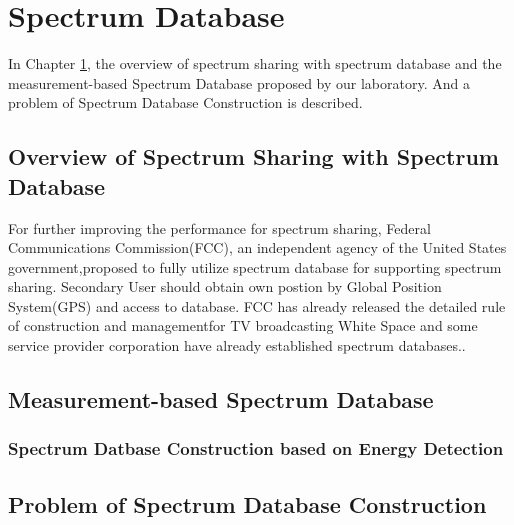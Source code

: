 \chapter[Spectrum Database]{Spectrum Database}
\label{chapter:Database}
In Chapter \ref{chapter:Database}, the overview of spectrum sharing with spectrum database and the measurement-based Spectrum Database proposed by our laboratory. And a problem of Spectrum Database Construction is described.

\section{Overview of Spectrum Sharing with Spectrum Database}
For further improving the performance for spectrum sharing, Federal Communications Commission(FCC), an independent agency of the United States government,proposed to fully utilize spectrum database for supporting spectrum sharing. Secondary User should obtain own postion by Global Position System(GPS) and access to database. FCC has already released the detailed rule of construction and managementfor TV broadcasting White Space and some service provider corporation have already established spectrum databases.\cite{ref:fcc,ref:google,ref:microsoft}.


\section{Measurement-based Spectrum Database}
    \subsection{Spectrum Datbase Construction based on Energy Detection}

\section{Problem of Spectrum Database Construction }

